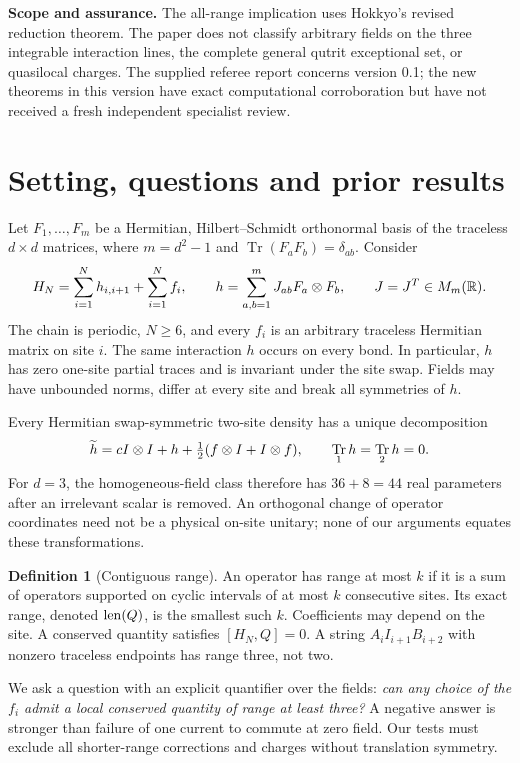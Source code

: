 \documentclass[11pt,a4paper]{article}
\numberwithin{equation}{section}
\theoremstyle{definition}\newtheorem{definition}[theorem]{Definition}
\theoremstyle{remark}\newtheorem{remark}[theorem]{Remark}
\DeclareMathOperator{\Tr}{Tr}\DeclareMathOperator{\rank}{rank}
\begin{document}
\textbf{Scope and assurance.} The all-range implication uses Hokkyo's revised reduction theorem. The paper does not classify arbitrary fields on the three integrable interaction lines, the complete general qutrit exceptional set, or quasilocal charges. The supplied referee report concerns version 0.1; the new theorems in this version have exact computational corroboration but have not received a fresh independent specialist review.

\section{Setting, questions and prior results}\label{sec:setting}

Let $F_1,\ldots,F_m$ be a Hermitian, Hilbert--Schmidt orthonormal basis of the traceless $d\times d$ matrices, where $m=d^2-1$ and $\Tr(F_aF_b)=\delta_{ab}$. Consider
\begin{equation}\label{eq:ham}
 H_N=\sum_{i=1}^N h_{i,i+1}+\sum_{i=1}^N f_i,
 \qquad h=\sum_{a,b=1}^m J_{ab}F_a\otimes F_b,
 \qquad J=J^T\in M_m(\mathbb R).
\end{equation}
The chain is periodic, $N\ge6$, and every $f_i$ is an arbitrary traceless Hermitian matrix on site $i$. The same interaction $h$ occurs on every bond. In particular, $h$ has zero one-site partial traces and is invariant under the site swap. Fields may have unbounded norms, differ at every site and break all symmetries of $h$.

Every Hermitian swap-symmetric two-site density has a unique decomposition
\[
 \widetilde h=cI\tens I+h+\tfrac12(f\tens I+I\tens f),
 \qquad \Tr_1h=\Tr_2h=0.
\]
For $d=3$, the homogeneous-field class therefore has $36+8=44$ real parameters after an irrelevant scalar is removed. An orthogonal change of operator coordinates need not be a physical on-site unitary; none of our arguments equates these transformations.

\begin{definition}[Contiguous range]
An operator has range at most $k$ if it is a sum of operators supported on cyclic intervals of at most $k$ consecutive sites. Its exact range, denoted $\operatorname{len}(Q)$, is the smallest such $k$. Coefficients may depend on the site. A conserved quantity satisfies $[H_N,Q]=0$. A string $A_iI_{i+1}B_{i+2}$ with nonzero traceless endpoints has range three, not two.
\end{definition}

We ask a question with an explicit quantifier over the fields: \emph{can any choice of the $f_i$ admit a local conserved quantity of range at least three?} A negative answer is stronger than failure of one current to commute at zero field. Our tests must exclude all shorter-range corrections and charges without translation symmetry.
\end{document}
